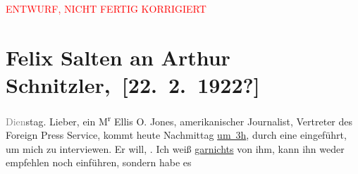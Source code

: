 
\begin{center}
            \textcolor{red}{ENTWURF, NICHT FERTIG KORRIGIERT}
                      \end{center}
            
         
         \renewcommand{\erwaehntePersonen}{Personen: Paul Claudel, Ellis O. Jones}
         \renewcommand{\erwaehnteInstitutionen}{Institutionen: Foreign Press Service}
         \renewcommand{\erwaehnteOrte}{Orte: Berlin, Vereinigte Staaten von Amerika (USA), Wien}
         \renewcommand{\erwaehnteWerke}{Werke: Der Tausch. Drama in drei Akten}
               \section[ Felix Salten an Arthur Schnitzler, {[}22. 2. 1922?{]}]{ Felix Salten an Arthur Schnitzler, {[}22. 2. 1922?{]}}\nopagebreak{}\rehead{ }\begin{ledgroupsized}[t]{13cm}\normalsize\beginnumbering \toendnotes[C]{\smallbreak\pagebreak[2]} 
\toendnotes[C]{\smallbreak}\pstart
           \raggedleft{}{\pb}\textcolor{gray}{Dien}stag.\pend
           \pstart{}Lieber,\pend\pstart
           ein M\textsuperscript{r}{ }Ellis O. Jones, amerikanischer Journalist, Vertreter des Foreign Press Service, kommt heute{ }Nachmittag \uline{um 3h}, durch eine \label{K_L03595-1v}\label{K_L03595-1h} eingeführt, um mich zu interviewen. Er
               will, \label{K_L03595-2v}\label{K_L03595-2h}. Ich weiß \uline{garnichts} von ihm, kann ihn weder empfehlen noch einführen, sondern habe es

\end{ledgroupsized}
